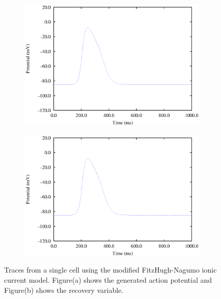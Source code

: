 \begin{figure}[hbtp] 
  \centering
  \begin{subfigure}[b]{0.45\linewidth}
    \centering
    \includegraphics[width=\textwidth]{cardiac_electrophysiology/epsfiles/FHNRVm.eps}
    \caption{}
  \end{subfigure}
  \hfill
  \begin{subfigure}[b]{0.45\linewidth}
    \centering
    \includegraphics[width=\textwidth]{cardiac_electrophysiology/epsfiles/FHNRVm.eps}
    \caption{}
  \end{subfigure}
  \caption[Traces from a single cell using the modified FitzHugh-Nagumo ionic current
    model]{Traces from a single cell using the modified FitzHugh-Nagumo ionic current
    model. Figure(a) shows the generated action potential and Figure(b) shows
    the recovery variable.}
  \label{fig:FHNR_1_cell_traces}
\end{figure}
%
